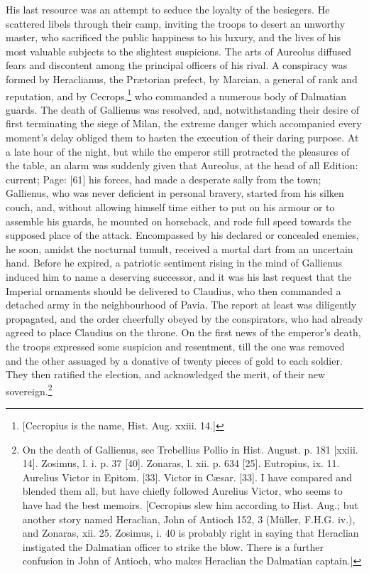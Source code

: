 His last resource was an attempt to seduce the loyalty of the besiegers. He scattered libels through their camp, inviting the troops to desert an unworthy master, who sacrificed the public happiness to his luxury, and the lives of his most valuable subjects to the slightest suspicions. The arts of Aureolus diffused fears and discontent among the principal officers of his rival. A conspiracy was formed by Heraclianus, the Prætorian prefect, by Marcian, a general of rank and reputation, and by Cecrops,\footnote{[Cecropius is the name, Hist. Aug. xxiii. 14.]} who commanded a numerous body of Dalmatian guards. The death of Gallienus was resolved, and, notwithstanding their desire of first terminating the siege of Milan, the extreme danger which accompanied every moment\texthebrew{}’s delay obliged them to hasten the execution of their daring purpose. At a late hour of the night, but while the emperor still protracted the pleasures of the table, an alarm was suddenly given that Aureolus, at the head of all Edition: current; Page: [61] his forces, had made a desperate sally from the town; Gallienus, who was never deficient in personal bravery, started from his silken couch, and, without allowing himself time either to put on his armour or to assemble his guards, he mounted on horseback, and rode full speed towards the supposed place of the attack. Encompassed by his declared or concealed enemies, he soon, amidst the nocturnal tumult, received a mortal dart from an uncertain hand. Before he expired, a patriotic sentiment rising in the mind of Gallienus induced him to name a deserving successor, and it was his last request that the Imperial ornaments should be delivered to Claudius, who then commanded a detached army in the neighbourhood of Pavia. The report at least was diligently propagated, and the order cheerfully obeyed by the conspirators, who had already agreed to place Claudius on the throne. On the first news of the emperor\texthebrew{}’s death, the troops expressed some suspicion and resentment, till the one was removed and the other assuaged by a donative of twenty pieces of gold to each soldier. They then ratified the election, and acknowledged the merit, of their new sovereign.\footnote{On the death of Gallienus, see Trebellius Pollio in Hist. August. p. 181 [xxiii. 14]. Zosimus, l. i. p. 37 [40]. Zonaras, l. xii. p. 634 [25]. Eutropius, ix. 11. Aurelius Victor in Epitom. [33]. Victor in Cæsar. [33]. I have compared and blended them all, but have chiefly followed Aurelius Victor, who seems to have had the best memoirs. [Cecropius slew him according to Hist. Aug.; but another story named Heraclian, John of Antioch 152, 3 (Müller, F.H.G. iv.), and Zonaras, xii. 25. Zosimus, i. 40 is probably right in saying that Heraclian instigated the Dalmatian officer to strike the blow. There is a further confusion in John of Antioch, who makes Heraclian the Dalmatian captain.]}

